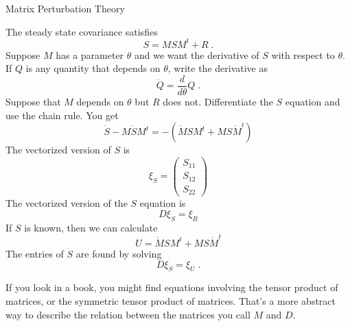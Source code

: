 \documentclass[11pt]{article}
\begin{document}
\begin{center}
Matrix Perturbation Theory
\end{center}
The steady state covariance satisfies
\[
      S = MSM^t + R  \; .
\]
Suppose $M$ has a parameter $\theta$ and we want the derivative of $S$ with respect to $\theta$.
If $Q$ is any quantity that depends on $\theta$, write the derivative as
\[
     \dot{Q} = \frac{d}{d\theta} Q \; .
\]
Suppose that $M$ depends on $\theta$ but $R$ does not.
Differentiate the $S$ equation and use the chain rule.
You get
\[
       \dot{S} - M \dot{S} M^t = - \left( \dot{M}SM^t + MS\dot{M}^t \right) 
\]
The vectorized version of $S$ is
\[
      \xi_S = \begin{pmatrix} S_{11} \\ S_{12} \\ S_{22} \end{pmatrix}
\]
The vectorized version of the $S$ equation is
\[
      D \xi_S = \xi_R
\]
If $S$ is known, then we can calculate
\[
        U = \dot{M}SM^t + MS\dot{M}^t
\]
The entries of $\dot{S}$ are found by solving
\[
       D \xi_{\dot{S}} = \xi_U \; .
\]

If you look in a book, you might find equations involving the tensor product of matrices, or the 
symmetric tensor product of matrices.  
That's a more abstract way to describe the relation between the matrices you call $M$ and $D$.
\end{document}
